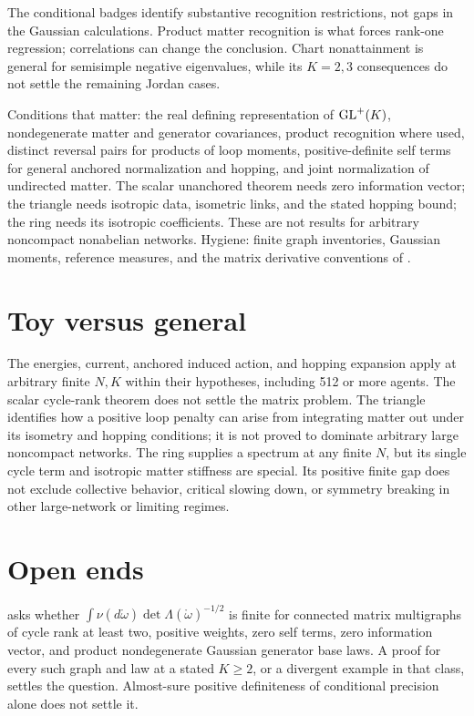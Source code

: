 The conditional badges identify substantive recognition restrictions, not gaps in the Gaussian
calculations. Product matter recognition is what forces rank-one regression; correlations can
change the conclusion. Chart nonattainment is general for semisimple negative eigenvalues, while
its \(K=2,3\) consequences do not settle the remaining Jordan cases.

\begin{hygiene}
Conditions that matter: the real defining representation of \(\mathrm{GL}^+(K)\), nondegenerate matter
and generator covariances, product recognition where used, distinct reversal pairs for products
of loop moments, positive-definite self terms for general anchored normalization and hopping,
and joint normalization of undirected matter. The scalar unanchored theorem needs zero
information vector; the triangle needs isotropic data, isometric links, and the stated hopping
bound; the ring needs its isotropic coefficients. These are not results for arbitrary noncompact
nonabelian networks. Hygiene: finite graph inventories, Gaussian moments, reference measures, and
the matrix derivative conventions of .
\end{hygiene}

\section{Toy versus general}

The energies, current, anchored induced action, and hopping expansion apply at arbitrary finite
\(N,K\) within their hypotheses, including 512 or more agents. The scalar cycle-rank theorem
does not settle the matrix problem. The triangle identifies how a positive loop penalty can arise
from integrating matter out under its isometry and hopping conditions; it is not proved to
dominate arbitrary large noncompact networks. The ring supplies a spectrum at any finite \(N\),
but its single cycle term and isotropic matter stiffness are special. Its positive finite gap
does not exclude collective behavior, critical slowing down, or symmetry breaking in other
large-network or limiting regimes.

\section{Open ends}

 asks whether
\(\int\nu(d\mathring\omega)\det\Lambda(\mathring\omega)^{-1/2}\) is finite for connected matrix
multigraphs of cycle rank at least two, positive weights, zero self terms, zero information vector,
and product nondegenerate Gaussian generator base laws. A proof for every such graph and law at a
stated \(K\geq2\), or a divergent example in that class, settles the question. Almost-sure
positive definiteness of conditional precision alone does not settle it.


